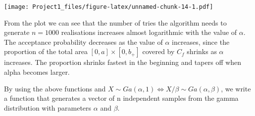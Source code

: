 \documentclass[]{article}
\begin{document}
\texttt{[image: Project1\_files/figure-latex/unnamed-chunk-14-1.pdf]}

From the plot we can see that the number of tries the algorithm needs to
generate \(n=1000\) realisations increases almost logarithmic with the
value of \(\alpha\). The acceptance probability decreases as the value
of \(\alpha\) increases, since the proportion of the total area
\(\left[0, a\right] \times \left[0, b_+\right]\) covered by \(C_f\)
shrinks as \(\alpha\) increases. The proportion shrinks fastest in the
beginning and tapers off when alpha becomes larger.

By using the above functions and
\(X \sim Ga(\alpha,1) \Leftrightarrow X/\beta \sim Ga(\alpha, \beta)\),
we write a function that generates a vector of n independent samples
from the gamma distribution with parameters \(\alpha\) and \(\beta\).
\end{document}
